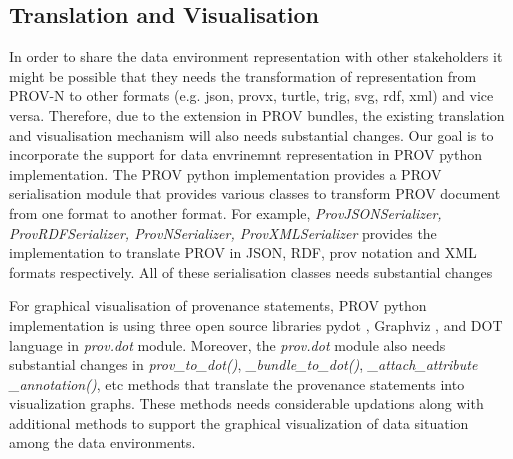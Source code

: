 \subsection{Translation and Visualisation} 
In order to share the data environment representation with other stakeholders it might be possible that they needs the transformation of representation from PROV-N to other formats (e.g. json, provx, turtle, trig, svg, rdf, xml) and vice versa. %
Therefore, due to the extension in PROV bundles, the existing translation and visualisation mechanism will also needs substantial changes.
Our goal is to incorporate the support for data envrinemnt representation in PROV python implementation. The PROV python implementation provides a PROV serialisation module \cite{provpythonpkg} that provides various classes to transform PROV document from one format to another format. For example, \textit{ProvJSONSerializer, ProvRDFSerializer, ProvNSerializer, ProvXMLSerializer} provides the implementation to translate PROV in JSON, RDF, prov notation and XML formats respectively. All of these serialisation classes needs substantial changes  

For graphical visualisation of provenance statements, PROV python implementation is using three open source libraries pydot \cite{pydot2021}, Graphviz \cite{ellson2001graphviz}, and DOT language \cite{gansner2006drawing} in \textit{prov.dot} module. Moreover, the \textit{prov.dot} module also needs substantial changes in \textit{prov\_to\_dot()},  \textit{ \_bundle\_to\_dot()},      \textit{\_attach\_attribute \_annotation()},  etc
methods that translate the  provenance statements into visualization graphs. 
These methods needs considerable updations along with additional methods  to support the graphical visualization of  data situation among the data environments. 